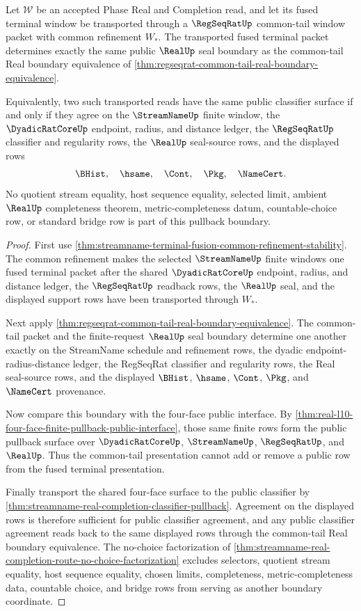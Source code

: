 \begin{theorem}
\label{thm:streamname-terminal-fusion-common-tail-real-boundary-pullback}
Let $\mathcal W$ be an accepted Phase Real and Completion read, and let its fused terminal window be transported through a $\RegSeqRatUp$ common-tail window packet with common refinement $W_\ast$. The transported fused terminal packet determines exactly the same public $\RealUp$ seal boundary as the common-tail Real boundary equivalence of \autoref{thm:regseqrat-common-tail-real-boundary-equivalence}.

Equivalently, two such transported reads have the same public classifier surface if and only if they agree on the $\StreamNameUp$ finite window, the $\DyadicRatCoreUp$ endpoint, radius, and distance ledger, the $\RegSeqRatUp$ classifier and regularity rows, the $\RealUp$ seal-source rows, and the displayed rows
$$
\BHist,\quad \hsame,\quad \Cont,\quad \Pkg,\quad \NameCert.
$$
No quotient stream equality, host sequence equality, selected limit, ambient $\RealUp$ completeness theorem, metric-completeness datum, countable-choice row, or standard bridge row is part of this pullback boundary.
\end{theorem}
\begin{proof}
First use \autoref{thm:streamname-terminal-fusion-common-refinement-stability}. The common refinement makes the selected $\StreamNameUp$ finite windows one fused terminal packet after the shared $\DyadicRatCoreUp$ endpoint, radius, and distance ledger, the $\RegSeqRatUp$ readback rows, the $\RealUp$ seal, and the displayed support rows have been transported through $W_\ast$.

Next apply \autoref{thm:regseqrat-common-tail-real-boundary-equivalence}. The common-tail packet and the finite-request $\RealUp$ seal boundary determine one another exactly on the StreamName schedule and refinement rows, the dyadic endpoint-radius-distance ledger, the RegSeqRat classifier and regularity rows, the Real seal-source rows, and the displayed $\BHist$, $\hsame$, $\Cont$, $\Pkg$, and $\NameCert$ provenance.

Now compare this boundary with the four-face public interface. By \autoref{thm:real-l10-four-face-finite-pullback-public-interface}, those same finite rows form the public pullback surface over $\DyadicRatCoreUp$, $\StreamNameUp$, $\RegSeqRatUp$, and $\RealUp$. Thus the common-tail presentation cannot add or remove a public row from the fused terminal presentation.

Finally transport the shared four-face surface to the public classifier by \autoref{thm:streamname-real-completion-classifier-pullback}. Agreement on the displayed rows is therefore sufficient for public classifier agreement, and any public classifier agreement reads back to the same displayed rows through the common-tail Real boundary equivalence. The no-choice factorization of \autoref{thm:streamname-real-completion-route-no-choice-factorization} excludes selectors, quotient stream equality, host sequence equality, chosen limits, completeness, metric-completeness data, countable choice, and bridge rows from serving as another boundary coordinate.
\end{proof}

